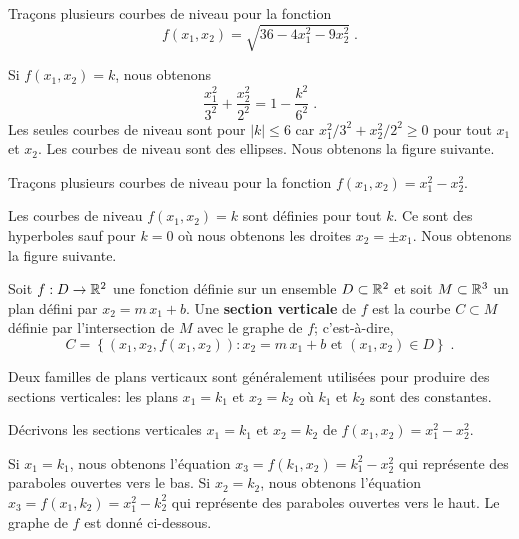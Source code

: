 {\begin{egg}
Traçons plusieurs courbes de niveau pour la fonction
\[
f(x_1,x_2) = \sqrt{36-4x_1^2-9x_2^2} \; .
\]

Si $f(x_1,x_2)=k$, nous obtenons
\[
\frac{x_1^2}{3^2} + \frac{x_2^2}{2^2} = 1- \frac{k^2}{6^2} \; .
\]
Les seules courbes de niveau sont pour $|k| \leq 6$ car
$x_1^2/3^2 + x_2^2/2^2 \geq 0$ pour tout $x_1$ et $x_2$.  Les courbes de
niveau sont des ellipses.  Nous obtenons la figure suivante.
\end{egg}

\begin{egg}
Traçons plusieurs courbes de niveau pour la fonction
$f(x_1,x_2) = x_1^2-x_2^2$.

Les courbes de niveau $f(x_1,x_2)=k$ sont
définies pour tout $k$.  Ce sont des hyperboles sauf pour
$k=0$ où nous obtenons les droites $x_2= \pm x_1$.  Nous obtenons la figure
suivante.
\end{egg}


\begin{defn}
Soit $f:D\rightarrow \mathbb{R}^2$ une fonction définie sur un ensemble
$D\subset \mathbb{R}^2$ et soit $M \subset \mathbb{R}^3$ un plan défini par
$x_2=m\,x_1+b$.  Une
{\bfseries section verticale} de $f$ est la
courbe $C \subset M$ définie par l'intersection de $M$ avec le graphe
de $f$; c'est-à-dire,
\[
C = \left\{ \left(x_1, x_2, f(x_1, x_2)\right) : x_2 = m\,x_1+b \text{ et }
(x_1,x_2) \in D \right\} \; .
\]
\end{defn}

Deux familles de plans verticaux sont généralement utilisées pour
produire des sections verticales: les plans $x_1=k_1$ et $x_2=k_2$ où
$k_1$ et $k_2$ sont des constantes.

\begin{egg}
Décrivons les sections verticales $x_1=k_1$ et $x_2=k_2$ de
$f(x_1,x_2) = x_1^2-x_2^2$.

Si $x_1=k_1$, nous obtenons l'équation $x_3=f(k_1,x_2)=k_1^2-x_2^2$
qui représente des paraboles ouvertes vers le bas.  Si $x_2=k_2$, nous
obtenons l'équation $x_3=f(x_1,k_2)=x_1^2-k_2^2$ qui représente des
paraboles ouvertes vers le haut.  Le graphe de $f$ est donné
ci-dessous.
\end{egg}

}
